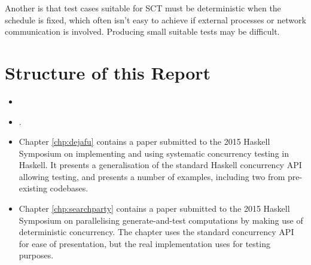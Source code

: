 Another is that test cases suitable for SCT must be deterministic when
the schedule is fixed, which often isn't easy to achieve if external
processes or network communication is involved. Producing small
suitable tests may be difficult.

\section{Structure of this Report}
\label{sec:intro-outline}

\begin{itemize}
  \item {}
  \item {}.
  \item Chapter \ref{chp:dejafu} contains a paper submitted to the
    2015 Haskell Symposium\cite{dejafu} on implementing and using
    systematic concurrency testing in Haskell. It presents a
    generalisation of the standard Haskell concurrency API allowing
    testing, and presents a number of examples, including two from
    pre-existing codebases.

  \item Chapter \ref{chp:searchparty} contains a paper submitted to
    the 2015 Haskell Symposium\cite{searchparty} on parallelising
    generate-and-test computations by making use of deterministic
    concurrency. The chapter uses the standard concurrency API for
    ease of presentation, but the real implementation uses \dejafu{}
    for testing purposes.
\end{itemize}
